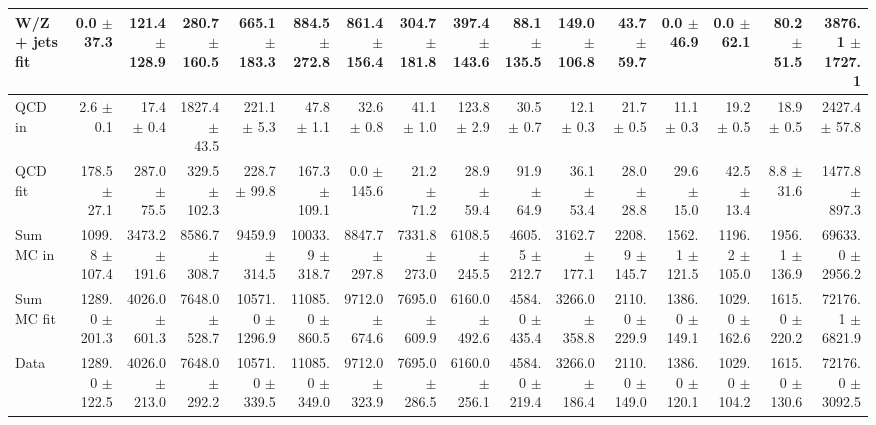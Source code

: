 \begin{table}[htbp]
{\begin{tabular}{lrrrrrrrrrrrrrrr}
W/Z + jets fit & 0.0 $\pm$ 37.3 & 121.4 $\pm$ 128.9 & 280.7 $\pm$ 160.5 & 665.1 $\pm$ 183.3 & 884.5 $\pm$ 272.8 & 861.4 $\pm$ 156.4 & 304.7 $\pm$ 181.8 & 397.4 $\pm$ 143.6 & 88.1 $\pm$ 135.5 & 149.0 $\pm$ 106.8 & 43.7 $\pm$ 59.7 & 0.0 $\pm$ 46.9 & 0.0 $\pm$ 62.1 & 80.2 $\pm$ 51.5 & 3876.1 $\pm$ 1727.1 \\
\hline
QCD in & 2.6 $\pm$ 0.1 & 17.4 $\pm$ 0.4 & 1827.4 $\pm$ 43.5 & 221.1 $\pm$ 5.3 & 47.8 $\pm$ 1.1 & 32.6 $\pm$ 0.8 & 41.1 $\pm$ 1.0 & 123.8 $\pm$ 2.9 & 30.5 $\pm$ 0.7 & 12.1 $\pm$ 0.3 & 21.7 $\pm$ 0.5 & 11.1 $\pm$ 0.3 & 19.2 $\pm$ 0.5 & 18.9 $\pm$ 0.5 & 2427.4 $\pm$ 57.8 \\
QCD fit & 178.5 $\pm$ 27.1 & 287.0 $\pm$ 75.5 & 329.5 $\pm$ 102.3 & 228.7 $\pm$ 99.8 & 167.3 $\pm$ 109.1 & 0.0 $\pm$ 145.6 & 21.2 $\pm$ 71.2 & 28.9 $\pm$ 59.4 & 91.9 $\pm$ 64.9 & 36.1 $\pm$ 53.4 & 28.0 $\pm$ 28.8 & 29.6 $\pm$ 15.0 & 42.5 $\pm$ 13.4 & 8.8 $\pm$ 31.6 & 1477.8 $\pm$ 897.3 \\
\hline
Sum MC in & 1099.8 $\pm$ 107.4 & 3473.2 $\pm$ 191.6 & 8586.7 $\pm$ 308.7 & 9459.9 $\pm$ 314.5 & 10033.9 $\pm$ 318.7 & 8847.7 $\pm$ 297.8 & 7331.8 $\pm$ 273.0 & 6108.5 $\pm$ 245.5 & 4605.5 $\pm$ 212.7 & 3162.7 $\pm$ 177.1 & 2208.9 $\pm$ 145.7 & 1562.1 $\pm$ 121.5 & 1196.2 $\pm$ 105.0 & 1956.1 $\pm$ 136.9& 69633.0 $\pm$ 2956.2 \\
Sum MC fit & 1289.0 $\pm$ 201.3 & 4026.0 $\pm$ 601.3 & 7648.0 $\pm$ 528.7 & 10571.0 $\pm$ 1296.9 & 11085.0 $\pm$ 860.5 & 9712.0 $\pm$ 674.6 & 7695.0 $\pm$ 609.9 & 6160.0 $\pm$ 492.6 & 4584.0 $\pm$ 435.4 & 3266.0 $\pm$ 358.8 & 2110.0 $\pm$ 229.9 & 1386.0 $\pm$ 149.1 & 1029.0 $\pm$ 162.6 & 1615.0 $\pm$ 220.2 & 72176.1 $\pm$ 6821.9 \\
\hline
Data & 1289.0 $\pm$ 122.5 & 4026.0 $\pm$ 213.0 & 7648.0 $\pm$ 292.2 & 10571.0 $\pm$ 339.5 & 11085.0 $\pm$ 349.0 & 9712.0 $\pm$ 323.9 & 7695.0 $\pm$ 286.5 & 6160.0 $\pm$ 256.1 & 4584.0 $\pm$ 219.4 & 3266.0 $\pm$ 186.4 & 2110.0 $\pm$ 149.0 & 1386.0 $\pm$ 120.1 & 1029.0 $\pm$ 104.2 & 1615.0 $\pm$ 130.6 & 72176.0 $\pm$ 3092.5 \\
\hline
\end{tabular}
}
\end{table}

